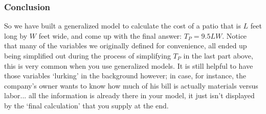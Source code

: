 \documentclass{ximeraXloud}
\begin{document}
\begin{example}
\begin{itemize}
        \end{itemize}
        
    
    \subsubsection*{Conclusion}
    
        So we have built a generalized model to calculate the cost of a patio that is $L$ feet long by $W$ feet wide, and come up with the final answer: $T_P = 9.5LW$. Notice that many of the variables we originally defined for convenience, all ended up being simplified out during the process of simplifying $T_P$ in the last part above, this is very common when you use generalized models. It is still helpful to have those variables `lurking' in the background however; in case, for instance, the company's owner wants to know how much of his bill is actually materials versus labor... all the information is already there in your model, it just isn't displayed by the `final calculation' that you supply at the end.

\end{example}
\end{document}
